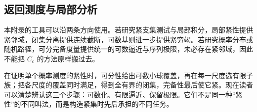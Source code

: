 \subsection{返回测度与局部分析}
\label{b1:subsec:A10503}

本附录的工具可以沿两条方向使用。若研究紧支集测试与局部积分，局部紧性提供紧邻域，闭集分离提供连续截断，可数基则进一步提供紧穷竭。若研究概率分布或随机路径，可分完备度量提供统一的可数逼近与序列极限，未必存在紧邻域，因此不能把 \(C_c\) 的方法原样搬过去。

\ProseParagraphBreak

在证明单个概率测度的紧性时，可分性给出可数小球覆盖，再在每一尺度选有限子族；把各尺度的覆盖同时满足，得到全有界的闭集，完备性最后使它紧。现在读者可以清楚辨认这三个步骤：可数化、有限逼近、保留极限。它们不是同一种“紧性”的不同叫法，而是构造紧集时先后承担的不同任务。
